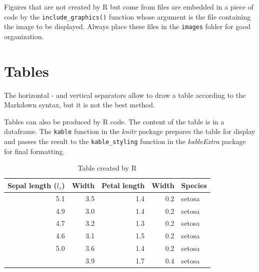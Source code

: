\documentclass[
  12pt,
  american,
  a4paper,
  extrafontsizes,onecolumn,openright
  ]{memoir}
\newenvironment{Shaded}{\begin{snugshade}}{\end{snugshade}}
\newcommand{\DataTypeTok}[1]{\textcolor[rgb]{0.13,0.29,0.53}{#1}}
\newcommand{\KeywordTok}[1]{\textcolor[rgb]{0.13,0.29,0.53}{\textbf{#1}}}
\newcommand{\NormalTok}[1]{#1}
\newcommand{\OperatorTok}[1]{\textcolor[rgb]{0.81,0.36,0.00}{\textbf{#1}}}
\newcommand{\OtherTok}[1]{\textcolor[rgb]{0.56,0.35,0.01}{#1}}
\newcommand{\StringTok}[1]{\textcolor[rgb]{0.31,0.60,0.02}{#1}}
\begin{document}
Figures that are not created by R but come from files are embedded in a piece of code by the \texttt{include\_graphics()} function whose argument is the file containing the image to be displayed.
Always place these files in the \texttt{images} folder for good organization.

\hypertarget{tables}{%
\section{Tables}\label{tables}}

The horizontal - and vertical separators \textbar{} allow to draw a table according to the Markdown syntax, but it is not the best method.

Tables can also be produced by R code.
The content of the table is in a dataframe.
The \texttt{kable} function in the \emph{knitr} package prepares the table for display and passes the result to the \texttt{kable\_styling} function in the \emph{kableExtra} package for final formatting.

\scriptsize

\begin{Shaded}
\end{Shaded}

\begin{table}

\caption{\label{tab:kable}Table created by R}
\centering
\begin{tabular}[t]{rrrrl}
\toprule
Sepal length ($l_s$) & Width & Petal length & Width & Species\\
\midrule
5.1 & 3.5 & 1.4 & 0.2 & setosa\\
4.9 & 3.0 & 1.4 & 0.2 & setosa\\
4.7 & 3.2 & 1.3 & 0.2 & setosa\\
4.6 & 3.1 & 1.5 & 0.2 & setosa\\
5.0 & 3.6 & 1.4 & 0.2 & setosa\\
\addlinespace
5.4 & 3.9 & 1.7 & 0.4 & setosa\\
\bottomrule
\end{tabular}
\end{table}
\end{document}
